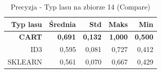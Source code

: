 \begin{table}[htbp]
\centering
\small
\setlength{\tabcolsep}{6pt}
\renewcommand{\arraystretch}{1.2}
\caption{Precyzja - Typ lasu na zbiorze 14 (Compare)}
\label{tab:Compare_on_14_precision}
\begin{tabular}{r|r|r|r|r}
\toprule
Typ lasu & Średnia & Std & Maks & Min \\
\hline
\textbf{CART} & \textbf{0,691} & \textbf{0,132} & \textbf{1,000} & \textbf{0,500} \\
ID3 & 0,595 & 0,081 & 0,727 & 0,412 \\
SKLEARN & 0,561 & 0,070 & 0,667 & 0,429 \\
\bottomrule
\end{tabular}
\end{table}